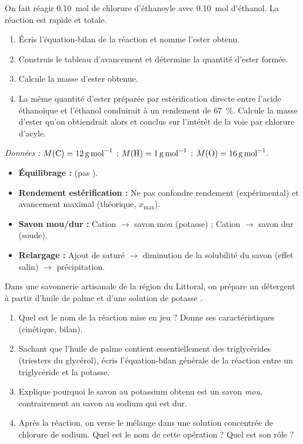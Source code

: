 \documentclass[11pt]{article}
\begin{document}
\begin{exercice}
On fait réagir \SI{0,10}{mol} de chlorure d'éthanoyle avec \SI{0,10}{mol} d'éthanol. La réaction est rapide et totale.
\begin{enumerate}
\item Écris l'équation-bilan de la réaction et nomme l'ester obtenu.
\item Construis le tableau d'avancement et détermine la quantité d'ester formée.
\item Calcule la masse d'ester obtenue.
\item La même quantité d'ester préparée par estérification directe entre l'acide éthanoïque et l'éthanol conduirait à un rendement de \SI{67}{\%}. Calcule la masse d'ester qu'on obtiendrait alors et conclus sur l'intérêt de la voie par chlorure d'acyle.
\end{enumerate}
\emph{Données :} $M(\ce{C}) = \SI{12}{g.mol^{-1}}$ ; $M(\ce{H}) = \SI{1}{g.mol^{-1}}$ ; $M(\ce{O}) = \SI{16}{g.mol^{-1}}$.
\end{exercice}

\begin{attention}
\begin{itemize}
\item \textbf{Équilibrage  :}  (pas ).
\item \textbf{Rendement estérification :} Ne pas confondre rendement (expérimental) et avancement maximal (théorique, $x_{\text{max}}$).
\item \textbf{Savon mou/dur :} Cation  $\rightarrow$ savon mou (potasse) ; Cation  $\rightarrow$ savon dur (soude).
\item \textbf{Relargage :} Ajout de  saturé $\rightarrow$ diminution de la solubilité du savon (effet salin) $\rightarrow$ précipitation.
\end{itemize}
\end{attention}

\begin{exercice}
Dans une savonnerie artisanale de la région du Littoral, on prépare un détergent à partir d'huile de palme et d'une solution de potasse .
\begin{enumerate}
\item Quel est le nom de la réaction mise en jeu ? Donne ses caractéristiques (cinétique, bilan).
\item Sachant que l'huile de palme contient essentiellement des triglycérides (triesters du glycérol), écris l'équation-bilan générale de la réaction entre un triglycéride et la potasse.
\item Explique pourquoi le savon au potassium obtenu est un savon \emph{mou}, contrairement au savon au sodium qui est dur.
\item Après la réaction, on verse le mélange dans une solution concentrée de chlorure de sodium. Quel est le nom de cette opération ? Quel est son rôle ?
\end{enumerate}
\end{exercice}
\end{document}
